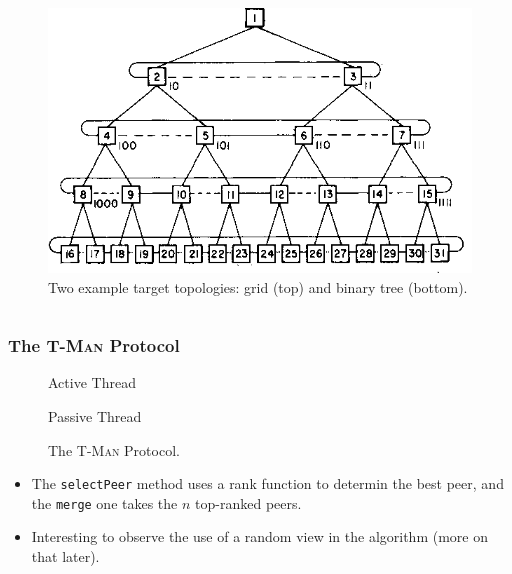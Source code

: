 \documentclass[10pt,    %
    english,            %
    xcolor=table,       %
    envcountsect,        %
    aspectratio=169     %
]{beamer}
\begin{document}
\begin{frame}
\begin{columns}
\begin{column}{.35\textwidth}
\begin{figure}[h!]
                \includegraphics[width=.6\textwidth]{./images/binary-tree-network-topology.png}
                \caption{Two example target topologies: grid (top) and binary tree (bottom).}
            \end{figure}
        \end{column}
    \end{columns}

\end{frame}

\begin{frame}
    \frametitle{The \textsc{T-Man} Protocol}

    \vspace{-25pt}

    \begin{figure}[h!]
    \centering
    \begin{minipage}[t]{.45\textwidth}
    \null 
     \begin{algorithm}[H]
        \DontPrintSemicolon
        \caption{Active Thread}
      \end{algorithm}
    \end{minipage}%
    \begin{minipage}[t]{.45\textwidth}
    \null
     \begin{algorithm}[H]
        \DontPrintSemicolon
        \caption{Passive Thread}
      \end{algorithm}
    \end{minipage}
    \caption{The \textsc{T-Man} Protocol.}
    \end{figure}

    \vspace{-20pt}

    \begin{itemize}
        \item The \texttt{selectPeer} method uses a rank function to determin the best peer, and the \texttt{merge} one takes the $n$ top-ranked peers.
        \item Interesting to observe the use of a random view in the algorithm (more on that later).
    \end{itemize}

\end{frame}
\end{document}
